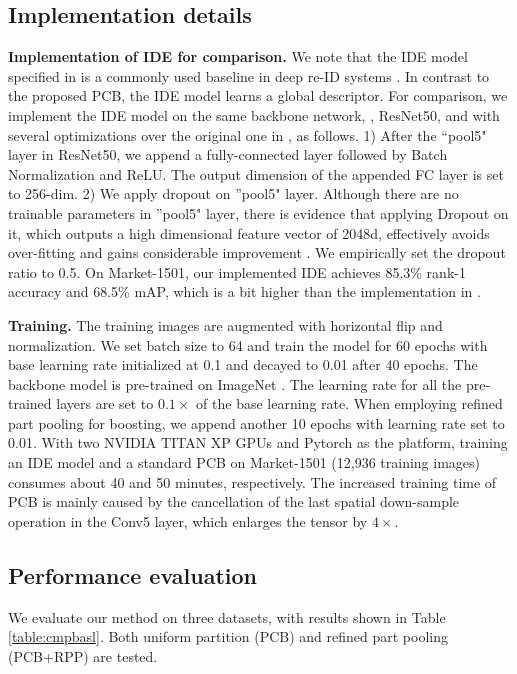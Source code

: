 \documentclass[10pt,twocolumn,letterpaper]{article}
\begin{document}
\subsection{Implementation details} 
\textbf{Implementation of IDE for comparison.} We note that the IDE model specified in \cite{DBLP:journals/corr/ZhengYH16} is a commonly used baseline in deep re-ID systems \cite{DBLP:journals/corr/ZhengYH16,DBLP:journals/corr/ZhengHLY17,DBLP:conf/cvpr/XiaoLOW16,geng2016deep,Sun2017SVDNet,Zheng2017PAN,zheng2017unlabeled,Zhong2017Random}. In contrast to the proposed PCB, the IDE model learns a global descriptor. For comparison, we implement the IDE model on the same backbone network, \ie, ResNet50, and with several optimizations over the original one in \cite{DBLP:journals/corr/ZhengYH16}, as follows.
1) After the ``pool5" layer in ResNet50, we append a fully-connected layer followed by Batch Normalization and ReLU. The output dimension of the appended FC layer is set to 256-dim. 2) We apply dropout on ''pool5" layer. Although there are no trainable parameters in ''pool5" layer, there is evidence that applying Dropout on it, which outputs a high dimensional feature vector of 2048d, effectively avoids over-fitting and gains considerable improvement \cite{Zheng2017PAN,zheng2017unlabeled}. We empirically set the dropout ratio to 0.5.
On Market-1501, our implemented IDE achieves 85.3\% rank-1 accuracy and 68.5\% mAP, which is a bit higher than the implementation in \cite{Zhong2017Random}. 

\textbf{Training.} The training images are augmented with horizontal flip and normalization. We set batch size to 64 and train the model for 60 epochs with base learning rate initialized at 0.1 and decayed to 0.01 after 40 epochs. The backbone model is pre-trained on ImageNet \cite{Deng2009imagenet}. The learning rate for all the pre-trained layers are set to  $0.1 \times$ of the base learning rate. When employing refined part pooling for boosting, we append another 10 epochs with learning rate set to 0.01. With two NVIDIA TITAN XP GPUs and Pytorch as the platform, training an IDE model and a standard PCB on Market-1501 (12,936 training images) consumes about 40 and 50 minutes, respectively. The increased training time of PCB is mainly caused by the cancellation of the last spatial down-sample operation in the Conv5 layer, which enlarges the tensor  by $4 \times$. 



\subsection{Performance evaluation}\label{sec:baseline}
We evaluate our method on three datasets, with results shown in Table \ref{table:cmpbasl}. Both uniform partition (PCB) and refined part pooling (PCB+RPP) are tested.
\end{document}
